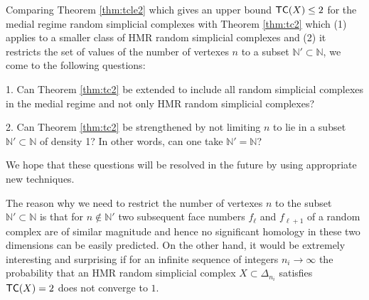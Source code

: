 \documentclass[11pt,twoside, reqno]{amsart}
\theoremstyle{plain}
\theoremstyle{definition}
\newcommand{\N}{\mathbb{N}}
\newcommand{\tc}{{\sf{TC}}}
\begin{document}
Comparing Theorem \ref{thm:tcle2} which gives an upper bound $\tc(X)\le 2$ for the medial regime random simplicial complexes with 
Theorem \ref{thm:tc2} which (1) applies to a smaller class of HMR random simplicial complexes and (2) it restricts the set of values of the number of vertexes $n$ to a subset $\N'\subset \N$, we come to the following questions: 

1. Can Theorem \ref{thm:tc2} be extended to include all random simplicial complexes in the medial regime and not only HMR random simplicial complexes? 

2. Can Theorem \ref{thm:tc2} be strengthened by not limiting $n$ to lie in a subset $\N'\subset \N$ of density 1? In other words, can one take $\N'=\N$? 

We hope that these questions will be resolved in the future by using appropriate new techniques.  

The reason why we need to restrict the number of vertexes $n$ to the subset $\N'\subset \N$ is that for $n\notin \N'$ two subsequent face numbers $f_\ell$ and $f_{\ell+1}$ of a random complex are of similar magnitude and hence no significant homology in these two dimensions can be easily predicted. On the other hand, it would be extremely interesting and surprising
if for an infinite sequence of integers $n_i\to \infty$ the probability that an HMR random simplicial complex $X\subset \Delta_{n_i}$ satisfies 
$\tc(X)=2$ does not converge to $1$. 
\end{document}
